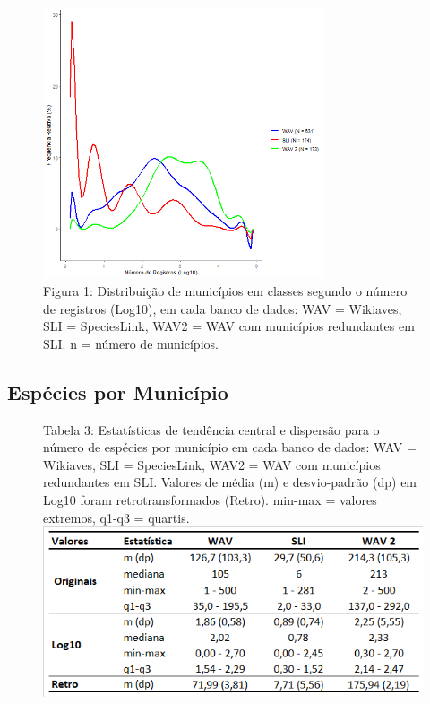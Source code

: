 \begin{figure}[h!]
\centering
\includegraphics[height = 8cm]{Imagens/113.png}
\\{\scriptsize Figura 1: Distribuição de municípios em classes segundo o número de registros (Log10), em cada banco de dados: WAV = Wikiaves, SLI = SpeciesLink, WAV2 = WAV com municípios redundantes em SLI. n = número de municípios.  }
\end{figure}

\subsection{Espécies por Município}

\begin{figure}[h!]
\centering
{\scriptsize Tabela 3: Estatísticas de tendência central e dispersão para o número de espécies por município em cada banco de dados: WAV = Wikiaves, SLI = SpeciesLink, WAV2 = WAV com municípios redundantes em SLI. Valores de média (m) e desvio-padrão (dp) em Log10 foram retrotransformados (Retro). min-max = valores extremos, q1-q3 = quartis.}
\includegraphics{Tabelas/3.png}
\end{figure}

